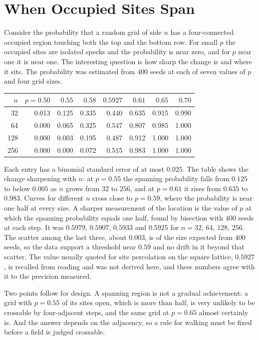 \section{When Occupied Sites Span}

Consider the probability that a random grid of side $n$ has a four-connected occupied region touching both the top and the bottom row. For small $p$ the occupied sites are isolated specks and the probability is near zero, and for $p$ near one it is near one. The interesting question is how sharp the change is and where it sits. The probability was estimated from $400$ seeds at each of seven values of $p$ and four grid sizes.

\begin{center}
\begin{tabular}{rrrrrrrr}
\toprule
$n$ & $p=0.50$ & $0.55$ & $0.58$ & $0.5927$ & $0.61$ & $0.65$ & $0.70$\\
\midrule
32  & 0.013 & 0.125 & 0.335 & 0.440 & 0.635 & 0.915 & 0.990\\
64  & 0.000 & 0.065 & 0.325 & 0.547 & 0.807 & 0.985 & 1.000\\
128 & 0.000 & 0.003 & 0.195 & 0.487 & 0.912 & 1.000 & 1.000\\
256 & 0.000 & 0.000 & 0.072 & 0.515 & 0.983 & 1.000 & 1.000\\
\bottomrule
\end{tabular}
\end{center}

Each entry has a binomial standard error of at most $0.025$. The table shows the change sharpening with $n$: at $p=0.55$ the spanning probability falls from $0.125$ to below $0.005$ as $n$ grows from $32$ to $256$, and at $p=0.61$ it rises from $0.635$ to $0.983$. Curves for different $n$ cross close to $p=0.59$, where the probability is near one half at every size. A sharper measurement of the location is the value of $p$ at which the spanning probability equals one half, found by bisection with $400$ seeds at each step. It was $0.5979$, $0.5907$, $0.5933$ and $0.5925$ for $n=32$, $64$, $128$, $256$. The scatter among the last three, about $0.003$, is of the size expected from $400$ seeds, so the data support a threshold near $0.59$ and no drift in it beyond that scatter. The value usually quoted for site percolation on the square lattice, $0.5927$, is recalled from reading and was not derived here, and these numbers agree with it to the precision measured.

Two points follow for design. A spanning region is not a gradual achievement: a grid with $p=0.55$ of its sites open, which is more than half, is very unlikely to be crossable by four-adjacent steps, and the same grid at $p=0.65$ almost certainly is. And the answer depends on the adjacency, so a rule for walking must be fixed before a field is judged crossable.

